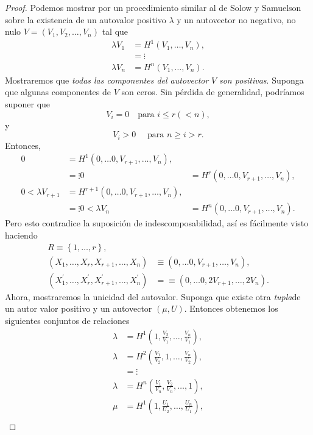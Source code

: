 \begin{proof}
Podemos mostrar por un procedimiento similar al de Solow y Samuelson sobre la existencia de un autovalor positivo $\lambda$ y un autovector no negativo, no nulo $V=\left(V_{1},V_{2},\ldots,V_{n}\right)$ tal que
\begin{align*}
\lambda V_{1}&=H^{1}\left(V_{1},\ldots,V_{n}\right),\\
&=\vdots\\
\lambda V_{n}&=H^{n}\left(V_{1},\ldots,V_{n}\right).
\end{align*}
Mostraremos que \emph{todas las componentes del autovector} $V$ \emph{son positivas}. Suponga que algunas componentes de $V$ son ceros. Sin pérdida de generalidad, podríamos suponer que \[ V_{i}=0\quad\text{para }i\leq r(<n), \] y \[ V_{i}>0\quad\text{ para }n\geq i>r. \] Entonces,
\begin{align*}
0&=H^{1}\left(0,\ldots0,V_{r+1},\ldots,V_{n}\right),\\
&=\vdots
0&=H^{r}\left(0,\ldots0,V_{r+1},\ldots,V_{n}\right),\\
0<\lambda V_{r+1}&=H^{r+1}\left(0,\ldots0,V_{r+1},\ldots,V_{n}\right),\\
&=\vdots
0<\lambda V_{n}&=H^{n}\left(0,\ldots0,V_{r+1},\ldots,V_{n}\right).
\end{align*}
Pero esto contradice la suposición de indescomposabilidad, así es fácilmente visto haciendo
\begin{align*}
R\equiv\left\{1,\ldots,r\right\},\\
\left(X_{1},\ldots,X_{r},X_{r+1},\ldots,X_{n}\right)
&\equiv\left(0,\ldots0,V_{r+1},\ldots,V_{n}\right),\\
\left(X^{\prime}_{1},\ldots,X^{\prime}_{r},X^{\prime}_{r+1},\ldots,X^{\prime}_{n}\right)
&=\equiv\left(0,\ldots0,2V_{r+1},\ldots,2V_{n}\right).
\end{align*}
Ahora, mostraremos la unicidad del autovalor. Suponga que existe otra \emph{tupla}de un autor valor positivo y un autovector $\left(\mu, U\right)$. Entonces obtenemos los siguientes conjuntos de relaciones
\begin{align}
\lambda&=H^{1}\left(1,\frac{V_{2}}{V_{1}},\ldots,\frac{V_{n}}{V_{1}}\right),\\
\lambda&=H^{2}\left(\frac{V_{1}}{V_{2}},1,\ldots,\frac{V_{n}}{V_{2}}\right),\\
&=\vdots\\
\lambda&=H^{n}\left(\frac{V_{1}}{V_{n}},\frac{V_{2}}{V_{n}},\ldots,1\right),\\
\mu&=H^{1}\left(1,\frac{U_{1}}{U_{2}},\ldots,\frac{U_{n}}{U_{1}}\right),\\

\end{align}
\end{proof}

